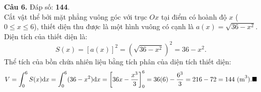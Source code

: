 \documentclass[12pt,a4paper]{article}
\begin{document}
\vspace{0.2cm}\noindent\textbf{Câu 6.} Đáp số: \textbf{144}.\\
Cắt vật thể bởi mặt phẳng vuông góc với trục $Ox$ tại điểm có hoành độ $x$ ($0 \le x \le 6$), thiết diện thu được là một hình vuông có cạnh là $a(x) = \sqrt{36 - x^2}$.\\
Diện tích của thiết diện là:
$$S(x) = [a(x)]^2 = \left(\sqrt{36 - x^2}\right)^2 = 36 - x^2.$$
Thể tích của bồn chứa nhiên liệu bằng tích phân của diện tích thiết diện:
$$V = \int_0^6 S(x) \mathrm{d}x = \int_0^6 (36 - x^2) \mathrm{d}x = \left[36x - \dfrac{x^3}{3}\right]_0^6 = 36(6) - \dfrac{6^3}{3} = 216 - 72 = 144\text{ (m}^3\text{)}.\hfill\blacksquare$$
\end{document}
